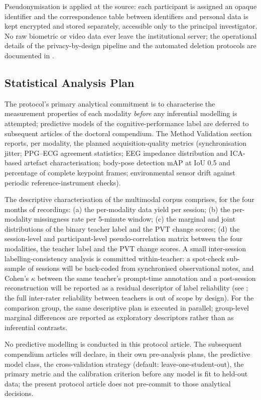 Pseudonymisation is applied at the source: each participant is assigned an opaque identifier and the correspondence table between identifiers and personal data is kept encrypted and stored separately, accessible only to the principal investigator. No raw biometric or video data ever leave the institutional server; the operational details of the privacy-by-design pipeline and the automated deletion protocols are documented in .

\subsection{Statistical Analysis Plan}\label{subsec:analysis-plan}

The protocol's primary analytical commitment is to characterise the measurement properties of each modality \emph{before} any inferential modelling is attempted; predictive models of the cognitive-performance label are deferred to subsequent articles of the doctoral compendium. The Method Validation section reports, per modality, the planned acquisition-quality metrics (synchronisation jitter; PPG--ECG agreement statistics; EEG impedance distribution and ICA-based artefact characterisation; body-pose detection mAP at IoU 0.5 and percentage of complete keypoint frames; environmental sensor drift against periodic reference-instrument checks).

The descriptive characterisation of the multimodal corpus comprises, for the four months of recordings: (a) the per-modality data yield per session; (b) the per-modality missingness rate per 5-minute window; (c) the marginal and joint distributions of the binary teacher label and the PVT change scores; (d) the session-level and participant-level pseudo-correlation matrix between the four modalities, the teacher label and the PVT change scores. A small inter-session labelling-consistency analysis is committed within-teacher: a spot-check sub-sample of sessions will be back-coded from synchronised observational notes, and Cohen's $\kappa$ between the same teacher's prompt-time annotation and a post-session reconstruction will be reported as a residual descriptor of label reliability (see ; the full inter-rater reliability between teachers is out of scope by design). For the comparison group, the same descriptive plan is executed in parallel; group-level marginal differences are reported as exploratory descriptors rather than as inferential contrasts.

No predictive modelling is conducted in this protocol article. The subsequent compendium articles will declare, in their own pre-analysis plans, the predictive model class, the cross-validation strategy (default: leave-one-student-out), the primary metric and the calibration criterion before any model is fit to held-out data; the present protocol article does not pre-commit to those analytical decisions.

